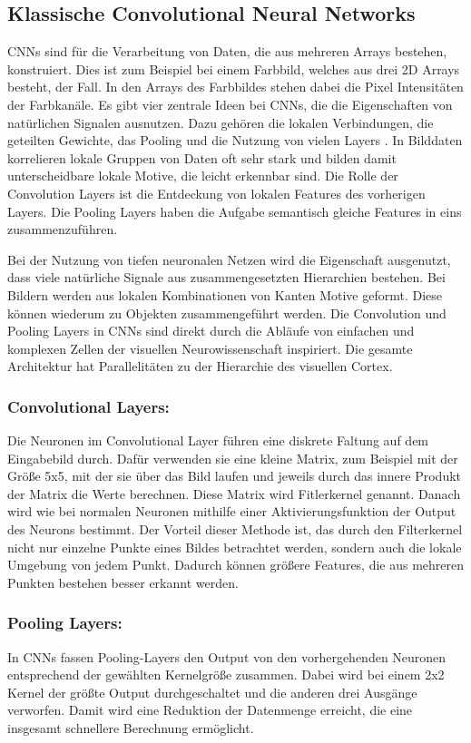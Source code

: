 \documentclass[runningheads,a4paper]{llncs}[2015/06/24]
\begin{document}
\subsection{Klassische Convolutional Neural Networks}
CNNs sind für die Verarbeitung von Daten, die aus mehreren Arrays bestehen, konstruiert. Dies ist zum Beispiel bei einem Farbbild, welches aus drei 2D Arrays besteht, der Fall. In den Arrays des Farbbildes stehen dabei die Pixel Intensitäten der Farbkanäle. Es gibt vier zentrale Ideen bei CNNs, die die Eigenschaften von natürlichen Signalen ausnutzen. Dazu gehören die lokalen Verbindungen, die geteilten Gewichte, das Pooling und die Nutzung von vielen Layers \cite{lecun_nature}. In Bilddaten korrelieren lokale Gruppen von Daten oft sehr stark und bilden damit unterscheidbare lokale Motive, die leicht erkennbar sind. Die Rolle der Convolution Layers ist die Entdeckung von lokalen Features des vorherigen Layers. Die Pooling Layers haben die Aufgabe semantisch gleiche Features in eins zusammenzuführen.

Bei der Nutzung von tiefen neuronalen Netzen wird die Eigenschaft ausgenutzt, dass viele natürliche Signale aus zusammengesetzten Hierarchien bestehen. Bei Bildern werden aus lokalen Kombinationen von Kanten Motive geformt. Diese können wiederum zu Objekten zusammengeführt werden. Die Convolution und Pooling Layers in CNNs sind direkt durch die Abläufe von einfachen und komplexen Zellen der visuellen Neurowissenschaft inspiriert. Die gesamte Architektur hat Parallelitäten zu der Hierarchie des visuellen Cortex. 

\subsubsection*{Convolutional Layers:}
Die Neuronen im Convolutional Layer führen eine diskrete Faltung auf dem Eingabebild durch. Dafür verwenden sie eine kleine Matrix, zum Beispiel mit der Größe 5x5, mit der sie über das Bild laufen und jeweils durch das innere Produkt der Matrix die Werte berechnen. Diese Matrix wird Fitlerkernel genannt. Danach wird wie bei normalen Neuronen mithilfe einer Aktivierungsfunktion der Output des Neurons bestimmt. Der Vorteil dieser Methode ist, das durch den Filterkernel nicht nur einzelne Punkte eines Bildes betrachtet werden, sondern auch die lokale Umgebung von jedem Punkt. Dadurch können größere Features, die aus mehreren Punkten bestehen besser erkannt werden.

\subsubsection*{Pooling Layers:}
In CNNs fassen Pooling-Layers den Output von den vorhergehenden Neuronen entsprechend der gewählten Kernelgröße zusammen. Dabei wird bei einem 2x2 Kernel der größte Output durchgeschaltet und die anderen drei Ausgänge verworfen. Damit wird eine Reduktion der Datenmenge erreicht, die eine insgesamt schnellere Berechnung ermöglicht.
\end{document}
